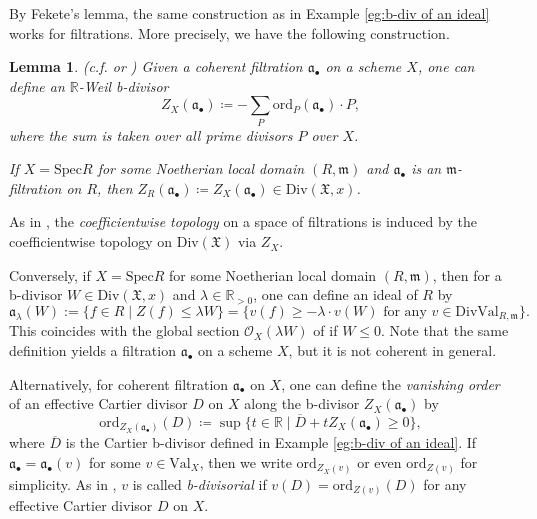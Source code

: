 \documentclass[11pt, leqno]{amsart}%
\theoremstyle{plain}
\newtheorem{lemma}[theorem]{Lemma}
\theoremstyle{definition}
\theoremstyle{remark}
\newcommand{\cO}{\mathcal{O}}
\newcommand{\bR}{\mathbb{R}}
\newcommand{\fX}{\mathfrak{X}}
\newcommand{\fa}{\mathfrak{a}}
\newcommand{\fm}{\mathfrak{m}}
\newcommand{\ord}{\mathrm{ord}}
\newcommand{\Val}{\mathrm{Val}}
\newcommand{\DivVal}{\mathrm{DivVal}}
\newcommand{\Spec}{\mathrm{Spec}}
\newcommand{\Div}{\mathrm{Div}}
\begin{document}
By Fekete's lemma, the same construction as in Example \ref{eg:b-div of an ideal} works for filtrations. More precisely, we have the following construction. 

\begin{lemma}(c.f. \cite[Lemma 2.11]{BdFF-vol-iso} or \cite[Proposition 3.1]{RU-b-div})
    Given a coherent filtration $\fa_\bullet$ on a scheme $X$, one can define an $\bR$-Weil b-divisor 
    \begin{equation*}%
        Z_X(\fa_\bullet)\coloneqq -\sum_P \ord_P(\fa_\bullet)\cdot P,
    \end{equation*}
    where the sum is taken over all prime divisors $P$ over $X$.

    If $X=\Spec R$ for some Noetherian local domain $(R,\fm)$ and $\fa_\bullet$ is an $\fm$-filtration on $R$, then $Z_R(\fa_\bullet)\coloneqq Z_X(\fa_\bullet)\in\Div(\fX,x)$. 
\end{lemma}

As in \cite{Qi-local}, the \emph{coefficientwise topology} on a space of filtrations is induced by the coefficientwise topology on $\Div(\fX)$ via $Z_X$.

\medskip
    
Conversely, if $X=\Spec R$ for some Noetherian local domain $(R,\fm)$, then for a b-divisor $W\in \Div(\fX,x)$ and $\lambda\in\bR_{>0}$, one can define an ideal of $R$ by
\begin{equation}\label{eqn:b-div to filtr local}
    \fa_\lambda(W):=\{f\in R\mid Z(f)\le \lambda W\}=\{v(f)\ge -\lambda \cdot v(W) \text{ for any } v\in\DivVal_{R,\fm}\}.
\end{equation}
This coincides with the global section $\cO_X(\lambda W)$ of \cite{BdFF-vol-iso} if $W\le 0$. 
Note that the same definition yields a filtration $\fa_\bullet$ on a scheme $X$, but it is not coherent in general. 


Alternatively, for coherent filtration $\fa_\bullet$ on $X$, one can define the \emph{vanishing order} of an effective Cartier divisor $D$ on $X$ along the b-divisor $Z_X(\fa_\bullet)$ by
\begin{equation}\label{eqn:vanishing order of b-div}
    \ord_{Z_X(\fa_\bullet)}(D)\coloneqq \sup\{t\in\bR\mid \overline D+tZ_X(\fa_\bullet)\ge 0\},
\end{equation}
where $\overline D$ is the Cartier b-divisor defined in Example \ref{eg:b-div of an ideal}. 
If $\fa_\bullet=\fa_\bullet(v)$ for some $v\in\Val_X$, then we write $\ord_{Z_X(v)}$ or even $\ord_{Z(v)}$ for simplicity. 
As in \cite[Section 3]{RU-b-div}, $v$ is called \emph{b-divisorial} if $v(D)=\ord_{Z(v)}(D)$ for any effective Cartier divisor $D$ on $X$. 
\end{document}
